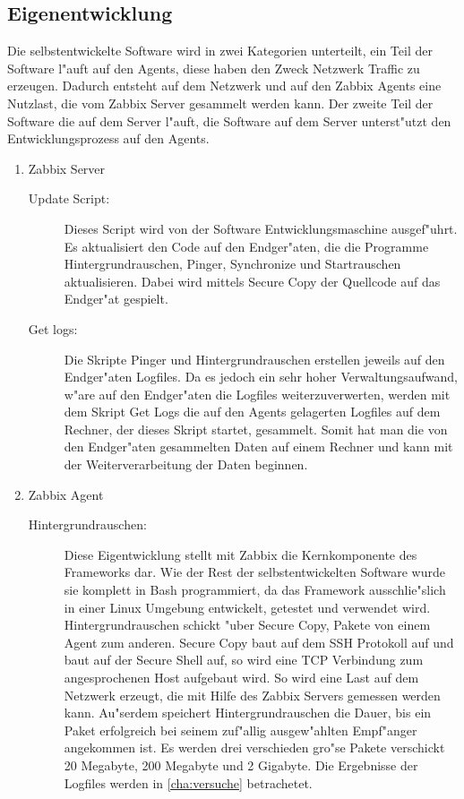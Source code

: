\subsection{Eigenentwicklung}
Die selbstentwickelte Software wird in zwei Kategorien unterteilt, ein Teil der Software l"auft %
auf den Agents, diese haben den Zweck Netzwerk Traffic zu erzeugen. Dadurch entsteht auf dem Netzwerk und %
auf den Zabbix Agents eine Nutzlast, die vom Zabbix Server gesammelt werden kann. Der zweite Teil der Software %
die auf dem Server l"auft, die Software auf dem Server unterst"utzt den Entwicklungsprozess auf den Agents. %
\begin{enumerate}
\item Zabbix Server 
\begin{description}
\item[Update Script:]Dieses Script wird von der Software Entwicklungsmaschine ausgef"uhrt. Es aktualisiert den Code auf den Endger"aten, %
die die Programme Hintergrundrauschen, Pinger, Synchronize und Startrauschen aktualisieren. Dabei wird mittels Secure Copy %
der Quellcode auf das Endger"at gespielt.

\item[Get logs:]Die Skripte Pinger und Hintergrundrauschen erstellen jeweils auf den Endger"aten Logfiles. %
Da es jedoch ein sehr hoher Verwaltungsaufwand, w"are auf den Endger"aten die Logfiles weiterzuverwerten, %
werden mit dem Skript Get Logs die auf den Agents gelagerten Logfiles auf dem Rechner, der dieses Skript %
startet, gesammelt. Somit hat man die von den Endger"aten gesammelten Daten auf einem Rechner und kann %
mit der Weiterverarbeitung der Daten beginnen.      

\end{description}

\item Zabbix Agent

\begin{description}
\item[Hintergrundrauschen:]Diese Eigentwicklung stellt mit Zabbix die Kernkomponente des Frameworks dar. Wie %
der Rest der selbstentwickelten Software wurde sie komplett in Bash programmiert, da das Framework ausschlie"slich %
in einer Linux Umgebung entwickelt, getestet und verwendet wird. Hintergrundrauschen schickt "uber Secure Copy, %
Pakete von einem Agent zum anderen. Secure Copy baut auf dem SSH Protokoll \autocite{artcl:thorbo}auf %
und baut auf der Secure Shell auf, so wird eine TCP Verbindung zum angesprochenen Host aufgebaut wird. %
So wird eine Last auf dem Netzwerk erzeugt, die mit Hilfe des Zabbix Servers  %
gemessen werden kann. Au"serdem speichert Hintergrundrauschen die Dauer, bis ein Paket erfolgreich %
bei seinem zuf"allig ausgew"ahlten Empf"anger angekommen ist. Es werden drei verschieden %
gro"se Pakete verschickt 20 Megabyte, 200 Megabyte und 2 Gigabyte. Die Ergebnisse der Logfiles %
werden in \cref{cha:versuche} betrachetet.


\end{description}
\end{enumerate}
